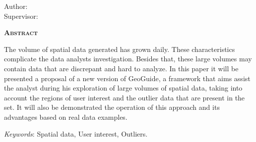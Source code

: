 \begin{center}
	{\Large{\textbf{\thesistitle}}}
\end{center}

\vspace{1cm}

\begin{flushright}
	Author: \thesisauthor\\
	Supervisor: \thesissupervisor
\end{flushright}

\vspace{1cm}

\begin{center}
	\Large{\textsc{\textbf{Abstract}}}
\end{center}

\noindent The volume of spatial data generated has grown daily. These characteristics complicate the data analysts investigation. Besides that, these large volumes may contain data that are discrepant and hard to analyze. In this paper it will be presented a proposal of a new version of GeoGuide, a framework that aims assist the analyst during his exploration of large volumes of spatial data, taking into account the regions of user interest and the outlier data that are present in the set. It will also be demonstrated the operation of this approach and its advantages based on real data examples.

\noindent\textit{Keywords}: Spatial data, User interest, Outliers.